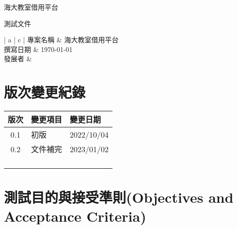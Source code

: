 \documentclass{article}
\begin{document}
\begin{titlepage}
	\centering

	{\huge 海大教室借用平台}

	\vfill

	{\huge 測試文件}

	\vfill

	\begin{Large}
		\begin{center}
			\begin{tabular}{| a | c |}
				\hline
				專案名稱 & 海大教室借用平台               \\ \hline
				撰寫日期 & \today                 \\ \hline
				發展者  &  \\ \hline
			\end{tabular}
		\end{center}
	\end{Large}
\end{titlepage}


\section*{版次變更紀錄}

\begin{tabularx}{\textwidth}{| c | X | X |}
	\rowcolor{LightGray}
	\hline
	版次  & 變更項目 & 變更日期       \\ \hline
	0.1 & 初版   & 2022/10/04 \\ \hline
	0.2 & 文件補完 & 2023/01/02 \\ \hline
	    &      &            \\ \hline
	    &      &            \\ \hline
	    &      &            \\ \hline
	    &      &            \\ \hline
\end{tabularx}

\newpage

\begin{center}
	\tableofcontents
\end{center}

\newpage

\section[測試目的與接受準則(OBJECTIVES AND ACCEPTANCE CRITERIA)]{測試目的與接受準則(Objectives and Acceptance Criteria)}
\end{document}
